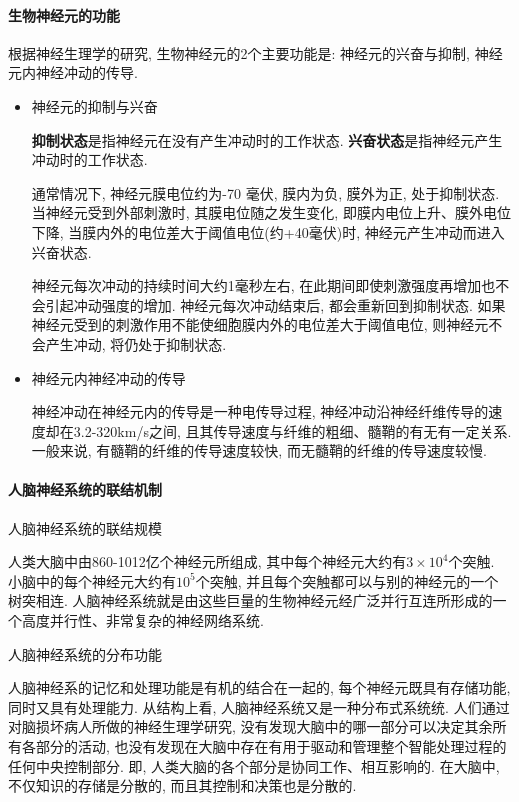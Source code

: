 \paragraph{生物神经元的功能}
根据神经生理学的研究, 生物神经元的2个主要功能是: 神经元的兴奋与抑制, 神经元内神经冲动的传导.
\begin{itemize}
\item {} 神经元的抑制与兴奋

\textbf{抑制状态}是指神经元在没有产生冲动时的工作状态. \textbf{兴奋状态}是指神经元产生冲动时的工作状态.

通常情况下, 神经元膜电位约为-70 毫伏, 膜内为负, 膜外为正, 处于抑制状态. 当神经元受到外部刺激时, 其膜电位随之发生变化, 即膜内电位上升、膜外电位下降, 当膜内外的电位差大于阈值电位(约+40毫伏)时, 神经元产生冲动而进入兴奋状态.

\begin{remark}
  神经元每次冲动的持续时间大约1毫秒左右, 在此期间即使刺激强度再增加也不会引起冲动强度的增加. 神经元每次冲动结束后, 都会重新回到抑制状态. 如果神经元受到的刺激作用不能使细胞膜内外的电位差大于阈值电位, 则神经元不会产生冲动, 将仍处于抑制状态.
\end{remark}

\item {} 神经元内神经冲动的传导

神经冲动在神经元内的传导是一种电传导过程, 神经冲动沿神经纤维传导的速度却在3.2-320\si{km/s}之间, 且其传导速度与纤维的粗细、髓鞘的有无有一定关系. 一般来说, 有髓鞘的纤维的传导速度较快, 而无髓鞘的纤维的传导速度较慢.
\end{itemize}
\paragraph{人脑神经系统的联结机制}

\quad {} 人脑神经系统的联结规模

人类大脑中由860-1012亿个神经元所组成, 其中每个神经元大约有$3\times 10^4$个突触. 小脑中的每个神经元大约有$10^5$个突触, 并且每个突触都可以与别的神经元的一个树突相连. 人脑神经系统就是由这些巨量的生物神经元经广泛并行互连所形成的一个高度并行性、非常复杂的神经网络系统.

\quad {} 人脑神经系统的分布功能

人脑神经系的记忆和处理功能是有机的结合在一起的, 每个神经元既具有存储功能, 同时又具有处理能力. 从结构上看, 人脑神经系统又是一种分布式系统统. 人们通过对脑损坏病人所做的神经生理学研究, 没有发现大脑中的哪一部分可以决定其余所有各部分的活动, 也没有发现在大脑中存在有用于驱动和管理整个智能处理过程的任何中央控制部分. 即, 人类大脑的各个部分是协同工作、相互影响的. 在大脑中, 不仅知识的存储是分散的, 而且其控制和决策也是分散的.
